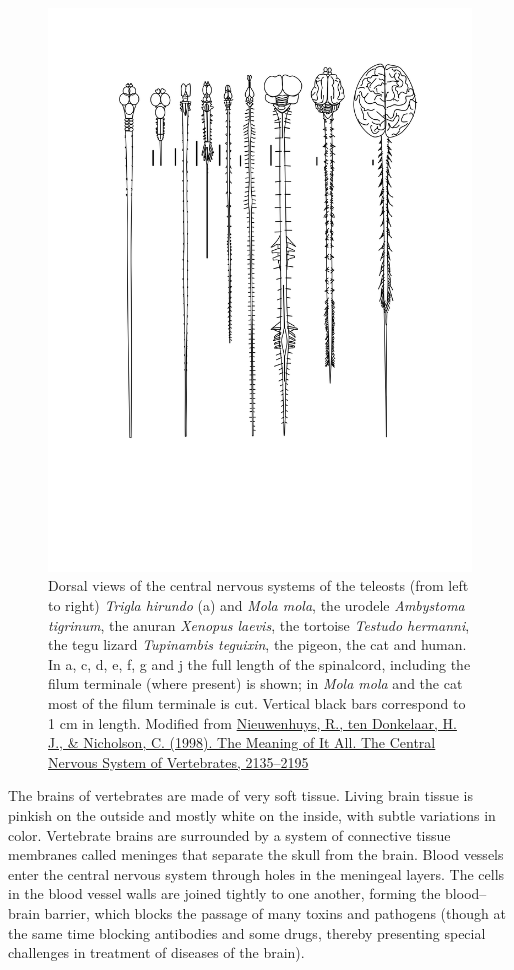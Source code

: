\begin{figure}

{\centering \includegraphics[width=0.7\linewidth]{./figures/nervoussystem/cns_comparison} 

}

\caption{Dorsal views of the central nervous systems of the teleosts (from left to right) \emph{Trigla hirundo} (a) and \emph{Mola mola}, the urodele \emph{Ambystoma tigrinum}, the anuran \emph{Xenopus laevis}, the tortoise \emph{Testudo hermanni}, the tegu lizard \emph{Tupinambis teguixin}, the pigeon, the cat and human. In a, c, d, e, f, g and j the full length of the spinalcord, including the filum terminale (where present) is shown; in \emph{Mola mola} and the cat most of the filum terminale is cut. Vertical black bars correspond to 1 cm in length. Modified from \href{https://doi.org/10.1007/978-3-642-18262-4_24}{Nieuwenhuys, R., ten Donkelaar, H. J., \& Nicholson, C. (1998). The Meaning of It All. The Central Nervous System of Vertebrates, 2135--2195}}\label{fig:vertebratecns}
\end{figure}

The brains of vertebrates are made of very soft tissue. Living brain tissue is pinkish on the outside and mostly white on the inside, with subtle variations in color. Vertebrate brains are surrounded by a system of connective tissue membranes called meninges that separate the skull from the brain. Blood vessels enter the central nervous system through holes in the meningeal layers. The cells in the blood vessel walls are joined tightly to one another, forming the blood--brain barrier, which blocks the passage of many toxins and pathogens (though at the same time blocking antibodies and some drugs, thereby presenting special challenges in treatment of diseases of the brain).

